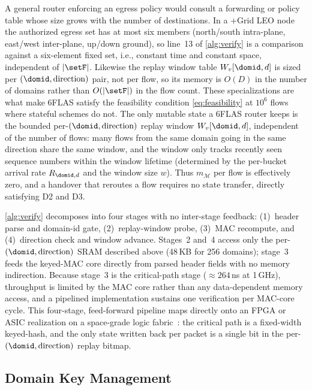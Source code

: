 A general router enforcing an egress policy would consult a forwarding or
policy table whose size grows with the number of destinations. In a $+$Grid LEO
node the authorized egress set has at most six members (north/south intra-plane,
east/west inter-plane, up/down ground), so line~13 of \cref{alg:verify} is a
comparison against a six-element fixed set, i.e., constant time and constant
space, independent of $|\setF|$. Likewise the replay window table $W_v[\domid, d]$ is sized
per $(\domid, \text{direction})$ pair, not per flow, so its memory is $O(D)$ in the number of domains rather than $O(|\setF|)$ in the flow count. These
specializations are what make 6FLAS satisfy the feasibility condition
\cref{eq:feasibility} at $10^6$ flows where stateful schemes do not. The only
mutable state a 6FLAS router keeps is the bounded per-$(\domid, \text{direction})$ replay window
$W_v[\domid, d]$, independent of the number of flows: many flows from the same domain going in the same direction share the same window,
and the window only tracks recently seen sequence numbers within the window lifetime (determined by the per-bucket arrival rate $R_{\domid,d}$ and the window size $w$).
Thus $m_{\mathcal{M}}$ per flow is effectively zero, and
a handover that reroutes a flow requires no state transfer, directly satisfying
D2 and D3.

\cref{alg:verify} decomposes into four stages with no inter-stage feedback:
(1)~header parse and domain-id gate, (2)~replay-window probe,
(3)~MAC recompute, and (4)~direction check and window advance.
Stages~2 and~4 access only the per-$(\domid, \text{direction})$ SRAM described above (48\,KB for 256 domains); stage~3
feeds the keyed-MAC core directly from parsed header fields with no memory
indirection. Because stage~3 is the critical-path stage (${\approx}264$\,ns at
1\,GHz), throughput is limited by the MAC core rather than any data-dependent
memory access, and a pipelined implementation sustains one verification per
MAC-core cycle. This four-stage, feed-forward pipeline maps directly onto an
FPGA or ASIC realization on a space-grade logic fabric~\cite{li2022}: the
critical path is a fixed-width keyed-hash, and the only state written back per
packet is a single bit in the per-$(\domid, \text{direction})$ replay bitmap.

\subsection{Domain Key Management}
\label{sec:keymgmt}

